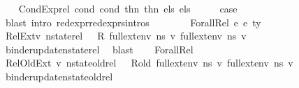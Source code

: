 \begin{isabellebody}
\isanewline
\ \ \isamarkupfalse%
\ {\isacharparenleft}{\kern0pt}CondExp{\isacharunderscore}{\kern0pt}rel\ cond{}\ cond{}\ thn{}\ thn{}\ els{}\ els{}{\isacharparenright}{\kern0pt}\isanewline
\ \ \isamarkupfalse%
\ \isamarkupfalse%
\ {\isacharquery}{\kern0pt}case\ \isamarkupfalse%
\ {\isacharparenleft}{\kern0pt}blast\ intro{\isacharcolon}{\kern0pt}\ red{\isacharunderscore}{\kern0pt}expr{\isacharunderscore}{\kern0pt}red{\isacharunderscore}{\kern0pt}exprs{\isachardot}{\kern0pt}intros{\isacharparenright}{\kern0pt}\ \ \ \ \isanewline
{}\isamarkupfalse%
\isanewline
\ \ \isamarkupfalse%
\ {\isacharparenleft}{\kern0pt}Forall{\isacharunderscore}{\kern0pt}Rel\ e{}\ e{}\ ty{\isacharparenright}{\kern0pt}\isanewline
\ \ \isamarkupfalse%
\ RelExt{\isacharcolon}{\kern0pt}{\isachardoublequoteopen}{\isasymAnd}v{\isachardot}{\kern0pt}\ nstate{\isacharunderscore}{\kern0pt}rel\ {\isasymLambda}\ {\isasymLambda}{\isacharprime}{\kern0pt}\ R\ {\isacharparenleft}{\kern0pt}full{\isacharunderscore}{\kern0pt}ext{\isacharunderscore}{\kern0pt}env\ ns{}\ v{\isacharparenright}{\kern0pt}\ {\isacharparenleft}{\kern0pt}full{\isacharunderscore}{\kern0pt}ext{\isacharunderscore}{\kern0pt}env\ ns{}\ v{\isacharparenright}{\kern0pt}{\isachardoublequoteclose}\ \isamarkupfalse%
\ binder{\isacharunderscore}{\kern0pt}update{\isacharunderscore}{\kern0pt}nstate{\isacharunderscore}{\kern0pt}rel\ \isamarkupfalse%
\ blast\isanewline
\ \ \isamarkupfalse%
\ Forall{\isacharunderscore}{\kern0pt}Rel\ \isamarkupfalse%
\ RelOldExt{\isacharcolon}{\kern0pt}\ {\isachardoublequoteopen}{\isasymAnd}v{\isachardot}{\kern0pt}\ nstate{\isacharunderscore}{\kern0pt}old{\isacharunderscore}{\kern0pt}rel\ {\isasymLambda}\ {\isasymLambda}{\isacharprime}{\kern0pt}\ R{\isacharunderscore}{\kern0pt}old\ {\isacharparenleft}{\kern0pt}full{\isacharunderscore}{\kern0pt}ext{\isacharunderscore}{\kern0pt}env\ ns{}\ v{\isacharparenright}{\kern0pt}\ {\isacharparenleft}{\kern0pt}full{\isacharunderscore}{\kern0pt}ext{\isacharunderscore}{\kern0pt}env\ ns{}\ v{\isacharparenright}{\kern0pt}{\isachardoublequoteclose}\ \isamarkupfalse%
\ binder{\isacharunderscore}{\kern0pt}update{\isacharunderscore}{\kern0pt}nstate{\isacharunderscore}{\kern0pt}old{\isacharunderscore}{\kern0pt}rel\ \isamarkupfalse%

\end{isabellebody}
